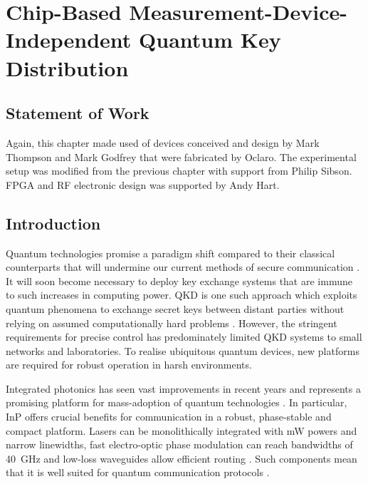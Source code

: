 %
%
\graphicspath{{./chapters/chapter04/fig04/}}

\let\textcircled=\pgftextcircled
\chapter[Chip-Based Measurement-Device-Independent QKD]{Chip-Based Measurement-Device-Independent Quantum Key Distribution}
\label{chap:mdiqkd}

\section*{Statement of Work}

Again, this chapter made used of devices conceived and design by Mark Thompson and Mark Godfrey that were fabricated by Oclaro. The experimental setup was modified from the previous chapter with support from Philip Sibson. FPGA and RF electronic design was supported by Andy Hart. 

\section{Introduction}

Quantum technologies promise a paradigm shift compared to their classical counterparts that will undermine our current methods of secure communication \cite{shor1994}. It will soon become necessary to deploy key exchange systems that are immune to such increases in computing power. \ac{QKD} is one such approach which exploits quantum phenomena to exchange secret keys between distant parties without relying on assumed computationally hard problems \cite{BB84, E91}. However, the stringent requirements for precise control has predominately limited \ac{QKD} systems to small networks and laboratories. To realise ubiquitous quantum devices, new platforms are required for robust operation in harsh environments. 

Integrated photonics has seen vast improvements in recent years and represents a promising platform for mass-adoption of quantum technologies \cite{thompson2011}. In particular, \ac{InP} offers crucial benefits for communication in a robust, phase-stable and compact platform. Lasers can be monolithically integrated with mW powers and narrow linewidths, fast electro-optic phase modulation can reach bandwidths of \SI{40}{GHz} and low-loss waveguides allow efficient routing \cite{smit2014}. Such components mean that it is well suited for quantum communication protocols \cite{Sibson2017InP}. 

